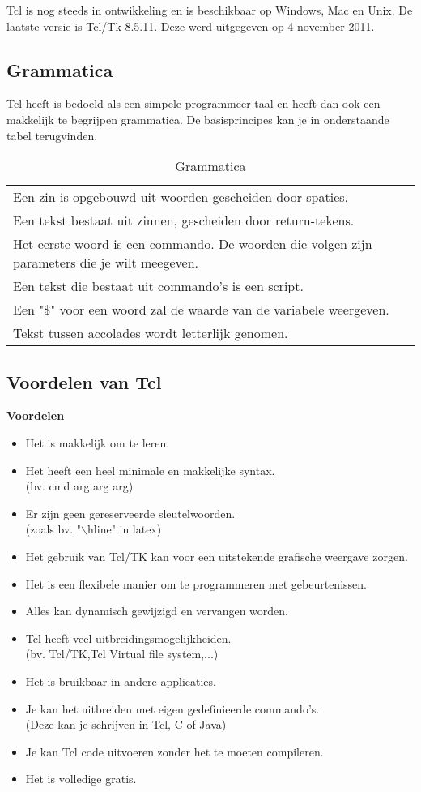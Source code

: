 \documentclass{article}
\begin{document}
\begin{flushleft}
Tcl is nog steeds in ontwikkeling en is beschikbaar op Windows, Mac en Unix. De laatste versie is Tcl/Tk 8.5.11. Deze werd uitgegeven op 4 november 2011.
\subsection{Grammatica}
Tcl heeft is bedoeld als een simpele programmeer taal en heeft dan ook een makkelijk te begrijpen grammatica. De basisprincipes kan je in onderstaande tabel terugvinden.\\
\begin{table}[!ht]
\begin{tabular}{l}
	Een zin is opgebouwd uit woorden gescheiden door spaties.\\
	Een tekst bestaat uit zinnen, gescheiden door return-tekens.\\
	Het eerste woord is een commando. De woorden die volgen zijn parameters die je wilt meegeven.\\
	Een tekst die bestaat uit commando's is een script.\\
	Een "\$" voor een woord zal de waarde van de variabele weergeven.\\
	Tekst tussen accolades wordt letterlijk genomen.
\end{tabular}
 \caption{Grammatica}
\end{table}
\subsection{Voordelen van Tcl}
\textbf{Voordelen}
\begin{itemize}
	\item Het is makkelijk om te leren.\\
	\item Het heeft een heel minimale en makkelijke syntax.\\(bv. cmd arg arg arg)
	\item Er zijn geen gereserveerde sleutelwoorden.\\(zoals bv. "$\backslash$hline" in latex)
	\item Het gebruik van Tcl/TK kan voor een uitstekende grafische weergave zorgen.
	\item Het is een flexibele manier om te programmeren met gebeurtenissen.
	\item Alles kan dynamisch gewijzigd en vervangen worden.
	\item Tcl heeft veel uitbreidingsmogelijkheiden.\\(bv. Tcl/TK,Tcl Virtual file system,...)
	\item Het is bruikbaar in andere applicaties.
	\item Je kan het uitbreiden met eigen gedefinieerde commando's.\\(Deze kan je schrijven in Tcl, C of Java)
	\item Je kan Tcl code uitvoeren zonder het te moeten compileren.
	\item Het is volledige gratis.
\end{itemize}


\end{flushleft}
\end{document}
